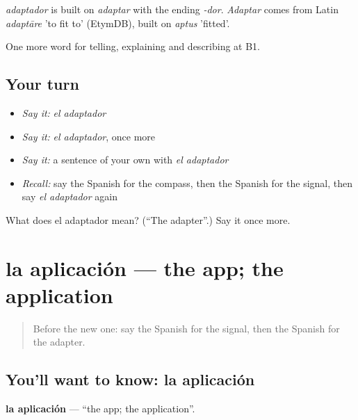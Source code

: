 \begin{cousinweb}
\emph{adaptador} is built on \emph{adaptar} with the ending \emph{-dor}. \emph{Adaptar} comes from Latin \emph{adaptāre} 'to fit to' (EtymDB), built on \emph{aptus} 'fitted'.
\end{cousinweb}

\begin{grammarlens}[title={What you've built}]
One more word for telling, explaining and describing at B1.
\end{grammarlens}

\subsection*{Your turn}
\begin{itemize}
\raggedright
  \item \emph{Say it:} \emph{el adaptador}
  \item \emph{Say it:} \emph{el adaptador}, once more
  \item \emph{Say it:} a sentence of your own with \emph{el adaptador}
  \item \emph{Recall:} say the Spanish for the compass, then the Spanish for the signal, then say \emph{el adaptador} again
\end{itemize}

\begin{tcolorbox}[breakable,colback=teal!4,colframe=teal!35!black,title={Before you move on}]
What does el adaptador mean? (\textquotedblleft{}The adapter\textquotedblright{}.) Say it once more.
\end{tcolorbox}
\section[la aplicación]{la aplicación — the app; the application}

\label{lesson:ES-C773-aplicacion}



\begin{quote}
Before the new one: say the Spanish for the signal, then the Spanish for the adapter.
\end{quote}

\subsection*{You'll want to know: la aplicación}
\textbf{la aplicación} — \textquotedblleft{}the app; the application\textquotedblright{}.

